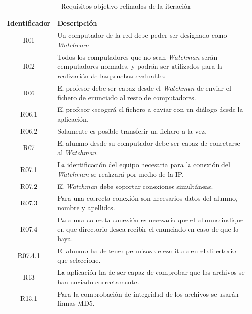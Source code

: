 \begin{table}
    \begin{tabular}{|c|p{10cm}|}
        \hline
        \textbf{Identificador} & \textbf{Descripción}
        \\ \hline

        R01 & Un computador de la red debe poder ser designado como \emph{Watchman}.
        \\ \hline

        R02 & Todos los computadores que no sean \emph{Watchman} serán computadores
        normales, y podrán ser utilizados para la realización de las pruebas evaluables.
        \\ \hline

        R06 & El profesor debe ser capaz desde el \emph{Watchman} de enviar el fichero de enunciado al resto de computadores.
        \\ \hline

        R06.1 & El profesor escogerá el fichero a enviar con un diálogo desde la aplicación.
        \\ \hline

        R06.2 & Solamente es posible transferir un fichero a la vez.
        \\ \hline

        R07 & El alumno desde su computador debe ser capaz de conectarse al \emph{Watchman}.
        \\ \hline

        R07.1 & La identificación del equipo necesaria para la conexión del \emph{Watchman} se realizará por medio de la IP.
        \\ \hline

        R07.2 & El \emph{Watchman} debe soportar conexiones simultáneas.
        \\ \hline

        R07.3 & Para una correcta conexión son necesarios datos del alumno, nombre y apellidos.
        \\ \hline

        R07.4 & Para una correcta conexión es necesario que el alumno indique en que directorio desea recibir el enunciado en caso de que lo haya.
        \\ \hline

        R07.4.1 & El alumno ha de tener permisos de escritura en el directorio que seleccione.
        \\ \hline

        R13 & La aplicación ha de ser capaz de comprobar que los archivos se han enviado correctamente.
        \\ \hline

        R13.1 & Para la comprobación de integridad de los archivos se usarán firmas MD5.
        \\ \hline

    \end{tabular}
    \caption{Requisitos objetivo refinados de la iteración}
    \label{tabla:iteracion1:requisitosObjetivoRefinados}
\end{table}



